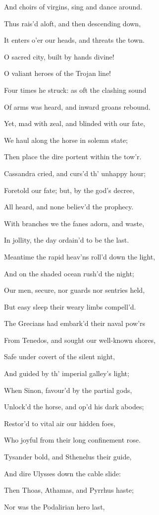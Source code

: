 And choirs of virgins, sing and dance around.

Thus rais’d aloft, and then descending down,

It enters o’er our heads, and threats the town.

O sacred city, built by hands divine!

O valiant heroes of the Trojan line!

Four times he struck: as oft the clashing sound

Of arms was heard, and inward groans rebound.

Yet, mad with zeal, and blinded with our fate,

We haul along the horse in solemn state;

Then place the dire portent within the tow’r.

Cassandra cried, and curs’d th’ unhappy hour;

Foretold our fate; but, by the god’s decree,

All heard, and none believ’d the prophecy.

With branches we the fanes adorn, and waste,

In jollity, the day ordain’d to be the last.

Meantime the rapid heav’ns roll’d down the light,

And on the shaded ocean rush’d the night;

Our men, secure, nor guards nor sentries held,

But easy sleep their weary limbs compell’d.

The Grecians had embark’d their naval pow’rs

From Tenedos, and sought our well-known shores,

Safe under covert of the silent night,

And guided by th’ imperial galley’s light;

When Sinon, favour’d by the partial gods,

Unlock’d the horse, and op’d his dark abodes;

Restor’d to vital air our hidden foes,

Who joyful from their long confinement rose.

Tysander bold, and Sthenelus their guide,

And dire Ulysses down the cable slide:

Then Thoas, Athamas, and Pyrrhus haste;

Nor was the Podalirian hero last,

